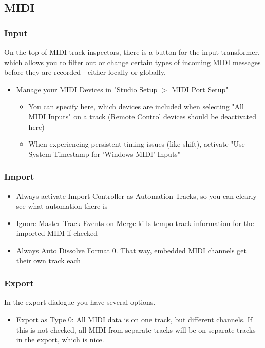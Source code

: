 \documentclass[10pt]{article}
\begin{document}
\subsection{MIDI}

\subsubsection{Input}

On the top of MIDI track inspectors, there is a button for the input transformer, which allows you to filter out or change certain types of incoming MIDI messages before they are recorded - either locally or globally.

\begin{itemize}
	\item Manage your MIDI Devices in "Studio Setup $>$ MIDI Port Setup"
	\begin{itemize}
		\item You can specify here, which devices are included when selecting "All MIDI Inputs" on a track (Remote Control devices should be deactivated here)
		\item When experiencing persistent timing issues (like shift), activate "Use System Timestamp for 'Windows MIDI' Inputs"
	\end{itemize}
\end{itemize}

\subsubsection{Import}

\begin{itemize}
	\item Always activate Import Controller as Automation Tracks, so you can clearly see what automation there is
	\item Ignore Master Track Events on Merge kills tempo track information for the imported MIDI if checked
	\item Always Auto Dissolve Format 0. That way, embedded MIDI channels get their own track each
\end{itemize}

\subsubsection{Export}

In the export dialogue you have several options.

\begin{itemize}
	\item Export as Type 0: All MIDI data is on one track, but different channels. If this is not checked, all MIDI from separate tracks will be on separate tracks in the export, which is nice.
\end{itemize}
\end{document}
